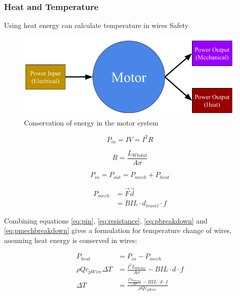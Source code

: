 \documentclass[a4paper,12pt]{article}
\begin{document}
\subsubsection{Heat and Temperature}
Using heat energy can calculate temperature in wires
Safety

\begin{figure}[h] \label{fg:motorheat}
\centering
\includegraphics[scale=0.4]{motorheat.png}
\caption{Conservation of energy in the motor system}
\end{figure}

\begin{equation}\label{eq:pin}
P_{in} = IV = I^2R
\end{equation}

\begin{equation}\label{eq:resistance}
R=\frac{L_{Wtotal}}{A\sigma}
\end{equation}

\begin{equation}\label{eq:pbreakdown}
P_{in}=P_{out}=P_{mech}+P_{heat}
\end{equation}

\begin{equation}\label{eq:pmechbreakdown}
\begin{split}
P_{mech} & = \vec{F}\vec{d}\\
& = BIL\cdot d_{travel} \cdot f
\end{split}
\end{equation}

Combining equations \ref{eq:pin}, \ref{eq:resistance}, \ref{eq:pbreakdown} and \ref{eq:pmechbreakdown} gives a formulation for temperature change of wires, assuming heat energy is conserved in wires:

\begin{equation}\label{eq:pheatbreakdown}
\begin{split}
P_{heat} & = P_{in}-P_{mech}\\
\rho Q c_{pWire} \Delta T & = \frac{I^2L_{Wtotal}}{A\sigma}-BIL\cdot d \cdot f \\
\Delta T & = \frac{\frac{I^2L_{Wtotal}}{A\sigma}-BIL\cdot d \cdot f}{\rho Q c_{pWire}}
\end{split}
\end{equation}
\end{document}

